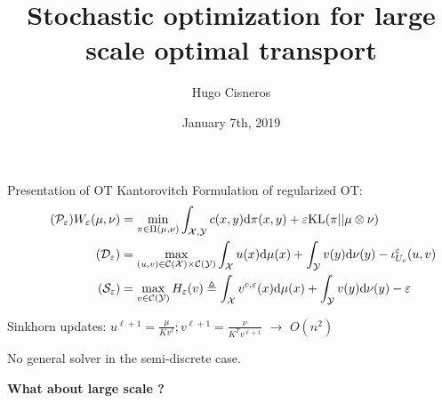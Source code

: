 \documentclass{beamer}
\title{Stochastic optimization for large scale optimal transport}
\author{Hugo Cisneros}
\date{January 7th, 2019}
\begin{document}
\maketitle

\begin{frame}{Presentation of OT}
    \vfill
    Kantorovitch Formulation of regularized OT: {\scriptsize\begin{align*}\tag{$\mathcal{P}_\varepsilon$}
    \label{eq:primal}
    W_\varepsilon(\mu, \nu) &= \min_{\pi\in \Pi(\mu, \nu)} \int_{\mathcal{X}, \mathcal{Y}} c(x, y)\text{d} \pi(x, y) + \varepsilon\text{KL}(\pi|| \mu \otimes \nu) \\
    \tag{$\mathcal{D_\varepsilon}$}
    & = \max_{(u, v)\in \mathcal{C}(\mathcal{X})\times\mathcal{C}(\mathcal{Y})} \int_\mathcal{X} u(x)\text{d}\mu(x) + \int_\mathcal{Y}v(y)\text{d}\nu(y) - \iota_{U_c}^\varepsilon(u, v)\\
    \tag{$\mathcal{S_\varepsilon}$}
   & = \max_{v\in\mathcal{C}(\mathcal{Y})} H_\varepsilon(v)\triangleq \int_\mathcal{X} v^{c,\varepsilon}(x)\text{d}\mu(x) + \int_\mathcal{Y}v(y)\text{d}\nu(y) - \varepsilon
    \end{align*}}

    Sinkhorn updates: $u^{\ell+1} = \frac{\mu}{Kv^\ell} ; v^{\ell+1} = \frac{\nu}{K^Tv^{\ell+1}}$ $\rightarrow$ $O(n^2)$

    No general solver in the semi-discrete case. 

    \begin{center}
        \textbf{What about large scale ?}
    \end{center}
\end{frame}
\end{document}
